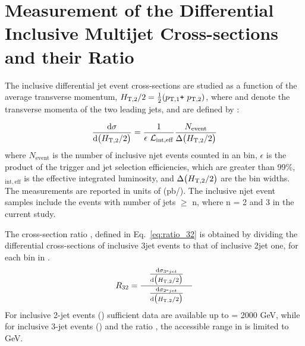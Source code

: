 \chapter{Measurement of the Differential Inclusive Multijet Cross-sections and their Ratio}
\label{chap:Measurement}
The inclusive differential jet event cross-sections are studied as a function of the average transverse momentum, $\httwo = \frac{1}{2}(\ptone\plus \pttwo)$, where \ptone and \pttwo denote the transverse momenta of the two leading jets, and are defined by :

\begin{equation}
 \label{eq:inclusive_formula}
 {\dd{\sigma}{\big(\httwo\big)}} = \frac{1}{\epsilon~\lumi_{\mathrm{int,eff}}}\frac{N_\mathrm{event}}{\Delta\big(\httwo\big)}
\end{equation}
where $N_\mathrm{event}$ is the number of inclusive n\hy jet events counted in an \httwo bin, $\epsilon$ is the product of the trigger and jet selection efficiencies, which are greater than 99\%, \lumins$_{\mathrm{int,eff}}$ is the effective integrated luminosity, and $ \Delta\big(H_{\mathrm{T,2}}/2\big)$ are the bin widths. The measurements are reported in units of (pb/\GeV). The inclusive n\hy jet event samples include the events with number of jets $\geq$ n, where n = 2 and 3 in the current study. 

The cross-section ratio \ratio, defined in Eq.~\ref{eq:ratio_32} is obtained by dividing the differential cross-sections of inclusive 3\hy jet events to that of inclusive 2\hy jet one, for each bin in \httwo.
\begin{equation}
 \label{eq:ratio_32}
 \ratio = \frac[10pt]{{\dd{\sigma_{3\hy jet}}{\big(\httwo\big)}}}{\dd{\sigma_{2\hy jet}}{\big(\httwo\big)}}
\end{equation}
For inclusive 2-jet events (\njt) sufficient data are available up to \httwo = 2000 GeV, while for inclusive 3-jet events (\njth) and the ratio \ratio, the accessible range in \httwo is limited to \httwo {} GeV.

